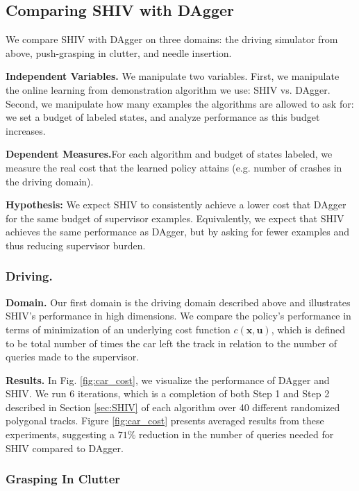 \documentclass[10pt, conference]{ieeeconf}      %
\newcommand{\bu}{\mathbf{u}}
\newcommand{\bx}{\mathbf{x}}
\begin{document}
\subsection{Comparing SHIV with DAgger}
We compare SHIV with DAgger on three domains: the driving simulator from above, push-grasping in clutter, and needle insertion.

\noindent\textbf{Independent Variables.} We manipulate two variables. First, we manipulate the online learning from demonstration algorithm we use: SHIV vs. DAgger. Second, we manipulate how many examples the algorithms are allowed to ask for: we set a budget of labeled states, and analyze performance as this budget increases.

\noindent\textbf{Dependent Measures.}For each algorithm and budget of states labeled, we measure the real cost that the learned policy attains (e.g. number of crashes in the driving domain).


\noindent\textbf{Hypothesis: } We expect SHIV to consistently achieve a lower cost that DAgger for the same budget of supervisor examples. Equivalently, we expect that SHIV achieves the same performance as DAgger, but by asking for fewer examples and thus reducing supervisor burden.

\subsubsection{Driving.}

\noindent\textbf{Domain.} Our first domain is the driving domain described above and illustrates SHIV's performance in high dimensions. 
We compare the policy's performance in terms of minimization of an underlying cost function $c(\bx,\bu)$, which is
defined to be total number of times the car left the track in relation to the number of queries made to the supervisor.

\noindent\textbf{Results.} 
In Fig. \ref{fig:car_cost}, we visualize the performance of DAgger and SHIV.  We run 6 iterations, which is a completion of both Step 1 and Step 2 described in Section \ref{sec:SHIV} of each algorithm over 40 different
randomized polygonal tracks. Figure \ref{fig:car_cost} presents averaged
results from these experiments, suggesting a $71\%$ reduction in the number of queries needed for SHIV compared to DAgger. 
 


\subsubsection{Grasping In Clutter}
\end{document}
